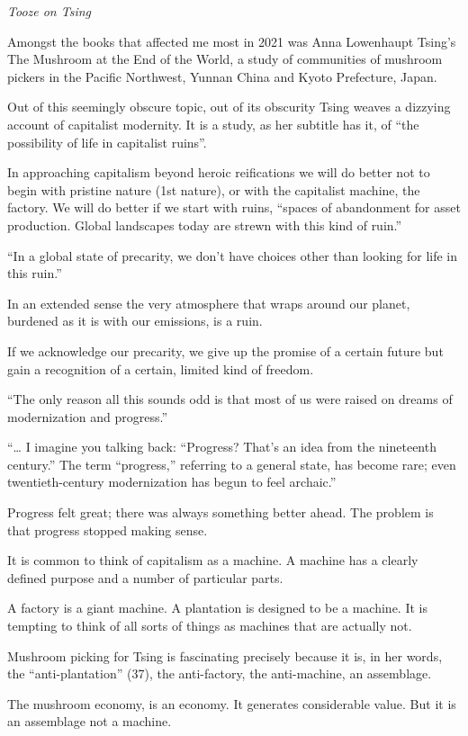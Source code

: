\documentclass[
]{book}
\begin{document}
\emph{Tooze on Tsing}

Amongst the books that affected me most in 2021 was Anna Lowenhaupt Tsing's The Mushroom at the End of the World, a study of communities of mushroom pickers in the Pacific Northwest, Yunnan China and Kyoto Prefecture, Japan.

Out of this seemingly obscure topic, out of its obscurity Tsing weaves a dizzying account of capitalist modernity. It is a study, as her subtitle has it, of ``the possibility of life in capitalist ruins''.

In approaching capitalism beyond heroic reifications we will do better not to begin with pristine nature (1st nature), or with the capitalist machine, the factory. We will do better if we start with ruins, ``spaces of abandonment for asset production. Global landscapes today are strewn with this kind of ruin.''

``In a global state of precarity, we don't have choices other than looking for life in this ruin.''

In an extended sense the very atmosphere that wraps around our planet, burdened as it is with our emissions, is a ruin.

If we acknowledge our precarity, we give up the promise of a certain future but gain a recognition of a certain, limited kind of freedom.

``The only reason all this sounds odd is that most of us were raised on dreams of modernization and progress.''

``\ldots{} I imagine you talking back: ``Progress? That's an idea from the nineteenth century.'' The term ``progress,'' referring to a general state, has become rare; even twentieth-century modernization has begun to feel archaic.''

Progress felt great; there was always something better ahead.
The problem is that progress stopped making sense.

It is common to think of capitalism as a machine. A machine has a clearly defined purpose and a number of particular parts.

A factory is a giant machine. A plantation is designed to be a machine. It is tempting to think of all sorts of things as machines that are actually not.

Mushroom picking for Tsing is fascinating precisely because it is, in her words, the ``anti-plantation'' (37), the anti-factory, the anti-machine, an assemblage.

The mushroom economy, is an economy. It generates considerable value. But it is an assemblage not a machine.
\end{document}
